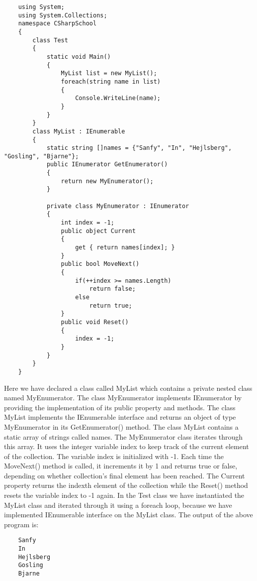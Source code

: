 \begin{lstlisting}
    using System;
    using System.Collections;
    namespace CSharpSchool
    {
        class Test
        {
            static void Main()
            {
                MyList list = new MyList();
                foreach(string name in list)
                {
                    Console.WriteLine(name);
                }
            }
        }
        class MyList : IEnumerable
        {
            static string []names = {"Sanfy", "In", "Hejlsberg", "Gosling", "Bjarne"};
            public IEnumerator GetEnumerator()
            {
                return new MyEnumerator();
            }
            
            private class MyEnumerator : IEnumerator
            {
                int index = -1;
                public object Current
                {
                    get { return names[index]; }
                }
                public bool MoveNext()
                {
                    if(++index >= names.Length)
                        return false;
                    else
                        return true;
                }
                public void Reset()
                {
                    index = -1;
                }
            }
        }
    }    
\end{lstlisting}

Here we have declared a class called MyList which contains a private nested class named MyEnumerator. The
class MyEnumerator implements IEnumerator by providing the implementation of its public property and
methods. The class MyList implements the IEnumerable interface and returns an object of type MyEnumerator in
its GetEnumerator() method. The class MyList contains a static array of strings called names. The MyEnumerator
class iterates through this array. It uses the integer variable index to keep track of the current element of the
collection. The variable index is initialized with -1. Each time the MoveNext() method is called, it increments it by
1 and returns true or false, depending on whether collection’s final element has been reached. The Current property
returns the indexth element of the collection while the Reset() method resets the variable index to -1 again.
In the Test class we have instantiated the MyList class and iterated through it using a foreach loop, because we
have implemented IEnumerable interface on the MyList class. The output of the above program is:

\begin{lstlisting}
    Sanfy
    In
    Hejlsberg
    Gosling
    Bjarne    
\end{lstlisting}